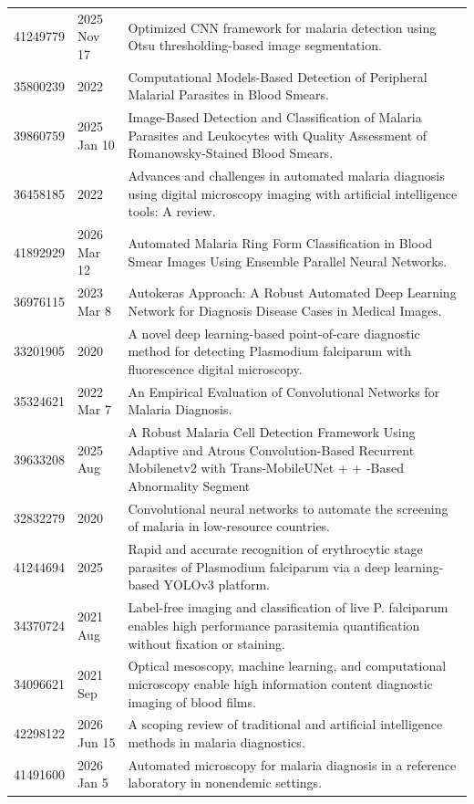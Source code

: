\begin{longtable}{llp{9.5cm}}
41249779 & 2025 Nov 17 & Optimized CNN framework for malaria detection using Otsu thresholding-based image segmentation. \\
35800239 & 2022 & Computational Models-Based Detection of Peripheral Malarial Parasites in Blood Smears. \\
39860759 & 2025 Jan 10 & Image-Based Detection and Classification of Malaria Parasites and Leukocytes with Quality Assessment of Romanowsky-Stained Blood Smears. \\
36458185 & 2022 & Advances and challenges in automated malaria diagnosis using digital microscopy imaging with artificial intelligence tools: A review. \\
41892929 & 2026 Mar 12 & Automated Malaria Ring Form Classification in Blood Smear Images Using Ensemble Parallel Neural Networks. \\
36976115 & 2023 Mar 8 & Autokeras Approach: A Robust Automated Deep Learning Network for Diagnosis Disease Cases in Medical Images. \\
33201905 & 2020 & A novel deep learning-based point-of-care diagnostic method for detecting Plasmodium falciparum with fluorescence digital microscopy. \\
35324621 & 2022 Mar 7 & An Empirical Evaluation of Convolutional Networks for Malaria Diagnosis. \\
39633208 & 2025 Aug & A Robust Malaria Cell Detection Framework Using Adaptive and Atrous Convolution-Based Recurrent Mobilenetv2 with Trans-MobileUNet + + -Based Abnormality Segment \\
32832279 & 2020 & Convolutional neural networks to automate the screening of malaria in low-resource countries. \\
41244694 & 2025 & Rapid and accurate recognition of erythrocytic stage parasites of Plasmodium falciparum via a deep learning-based YOLOv3 platform. \\
34370724 & 2021 Aug & Label-free imaging and classification of live P. falciparum enables high performance parasitemia quantification without fixation or staining. \\
34096621 & 2021 Sep & Optical mesoscopy, machine learning, and computational microscopy enable high information content diagnostic imaging of blood films. \\
42298122 & 2026 Jun 15 & A scoping review of traditional and artificial intelligence methods in malaria diagnostics. \\
41491600 & 2026 Jan 5 & Automated microscopy for malaria diagnosis in a reference laboratory in nonendemic settings. \\

\end{longtable}
